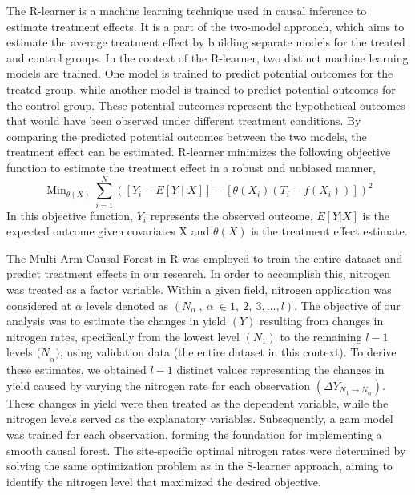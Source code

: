 \documentclass[
  12pt,
]{article}
\begin{document}
The R-learner is a machine learning technique used in causal inference to estimate treatment effects. It is a part of the two-model approach, which aims to estimate the average treatment effect by building separate models for the treated and control groups.
In the context of the R-learner, two distinct machine learning models are trained. One model is trained to predict potential outcomes for the treated group, while another model is trained to predict potential outcomes for the control group. These potential outcomes represent the hypothetical outcomes that would have been observed under different treatment conditions. By comparing the predicted potential outcomes between the two models, the treatment effect can be estimated.
R-learner minimizes the following objective function to estimate the treatment effect in a robust and unbiased manner,
\[
\operatorname{Min}_{\theta(X)} \sum_{i=1}^N\left(\left[Y_i-E[Y \mid X]\right]-\left[\theta\left(X_i\right)\left(T_i-f\left(X_i\right)\right)\right]\right)^2
\]
In this objective function, \(Y_i\) represents the observed outcome, \(E[Y|X]\) is the expected outcome given covariates X and \(\theta(X)\) is the treatment effect estimate.

The Multi-Arm Causal Forest in R was employed to train the entire dataset and predict treatment effects in our research. In order to accomplish this, nitrogen was treated as a factor variable. Within a given field, nitrogen application was considered at \(\alpha\) levels denoted as \((N_\alpha\ ,\ \alpha\ \in{1,\ 2,\ 3,...,l})\). The objective of our analysis was to estimate the changes in yield \((Y)\) resulting from changes in nitrogen rates, specifically from the lowest level \((N_1)\) to the remaining \(l-1\) levels \({(N}_\alpha)\), using validation data (the entire dataset in this context).
To derive these estimates, we obtained \(l-1\) distinct values representing the changes in yield caused by varying the nitrogen rate for each observation \(\left(\Delta Y_{N_1 \rightarrow N_\alpha}\right)\). These changes in yield were then treated as the dependent variable, while the nitrogen levels served as the explanatory variables. Subsequently, a gam model was trained for each observation, forming the foundation for implementing a smooth causal forest.
The site-specific optimal nitrogen rates were determined by solving the same optimization problem as in the S-learner approach, aiming to identify the nitrogen level that maximized the desired objective.
\end{document}
